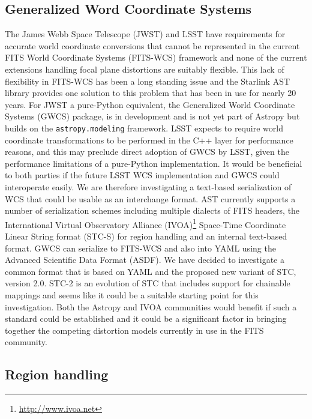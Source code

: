 \documentclass[]{spie}  %
\begin{document}
\subsection{Generalized Word Coordinate Systems}

The James Webb Space Telescope (JWST)\cite{2006SSRv..123..485G} and LSST have requirements for accurate world coordinate conversions that cannot be represented in the current FITS World Coordinate Systems (FITS-WCS) framework\cite{2013ASPC..475...49H,2002A&A...395.1077C,2015A&C....12..133T} and none of the current extensions handling focal plane distortions\cite{2012SPIE.8451E..1MS,2012tpv} are suitably flexible.
This lack of flexibility in FITS-WCS has been a long standing issue and the Starlink AST library\cite{Berry201633} provides one solution to this problem that has been in use for nearly 20 years.
For JWST a pure-Python equivalent, the Generalized World Coordinate Systems (GWCS) package, is in development\cite{2016_P028_adassxxv} and is not yet part of Astropy but builds on the \texttt{astropy.modeling} framework.
LSST expects to require world coordinate transformations to be performed in the C++ layer for performance reasons, and this may preclude direct adoption of GWCS by LSST, given the performance limitations of a pure-Python implementation.
It would be beneficial to both parties if the future LSST WCS implementation and GWCS could interoperate easily.
We are therefore investigating a text-based serialization of WCS that could be usable as an interchange format.
AST currently supports a number of serialization schemes including multiple dialects of FITS headers, the International Virtual Observatory Alliance (IVOA)\footnote{\url{http://www.ivoa.net}} Space-Time Coordinate Linear String format (STC-S)\cite{2007ivoa.spec.1030R} for region handling\cite{2010ASPC..434..213B} and an internal text-based format.
GWCS can serialize to FITS-WCS and also into YAML\cite{2009yaml} using the Advanced Scientific Data Format (ASDF)\cite{2015A&C....12..240G}.
We have decided to investigate a common format that is based on YAML and the proposed new variant of STC, version 2.0.
STC-2\cite{2015ivoaSTC2} is an evolution of STC that includes support for chainable mappings and seems like it could be a suitable starting point for this investigation.
Both the Astropy and IVOA communities would benefit if such a standard could be established and it could be a significant factor in bringing together the competing distortion models currently in use in the FITS community.

\subsection{Region handling}
\end{document}

